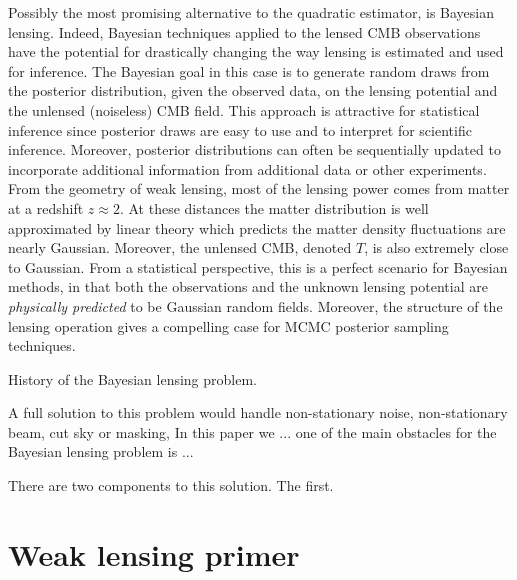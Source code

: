\documentclass[noinfoline]{imsart}
\begin{document}
 Possibly the most promising alternative to the quadratic estimator, is Bayesian lensing. Indeed, Bayesian techniques applied to the lensed CMB observations have the potential for drastically changing the way lensing is estimated and used for inference. The Bayesian goal in this case is to generate random draws from the posterior distribution, given the observed data, on the lensing potential and the unlensed (noiseless) CMB field. This approach is attractive for statistical inference since posterior draws are easy to use and to interpret for scientific inference. Moreover, posterior distributions can often be sequentially updated to incorporate additional information from additional data or other experiments.
 From the geometry of weak lensing, most of the lensing power comes from matter at a redshift $z\approx 2$. At these distances the matter distribution is well approximated by linear theory which predicts the matter density fluctuations are nearly Gaussian. Moreover, the unlensed CMB, denoted  $T$, is also extremely close to Gaussian.  From a statistical perspective, this is a perfect scenario for Bayesian methods, in that both the observations and the unknown lensing potential are {\em physically predicted} to be Gaussian random fields.  Moreover, the structure of the lensing operation gives a compelling case for MCMC posterior sampling techniques.
 


History of the Bayesian lensing problem.

A full solution to this problem would handle non-stationary noise, non-stationary beam, cut sky or masking, In this paper we ... one of the main obstacles for the Bayesian lensing problem is ...

There are two components to this solution. The first.

\section{Weak lensing primer}
\end{document}
